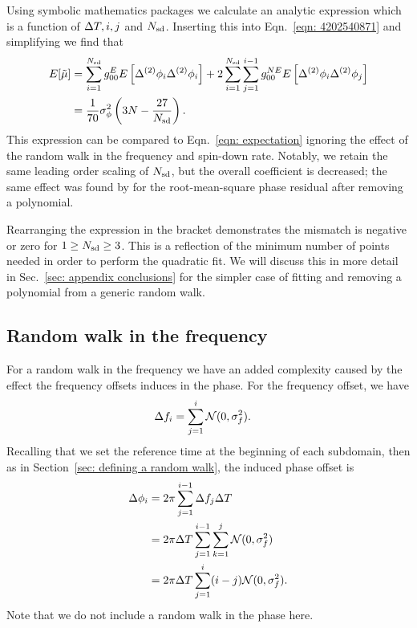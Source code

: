 \documentclass[../full_thesis/full_thesis.tex]{subfiles}
\begin{document}
Using symbolic mathematics packages we
calculate an analytic expression which is a function of $\Delta T, i, j$ and $N_{\textrm{sd}}$.
Inserting this into Eqn.~\eqref{eqn: 4202540871} and simplifying we find that
\begin{align}
E[\tilde{\mu}]  & = \sum_{i=1}^{N_{\textrm{sd}}}g_{00}^{E} E\left[\Delta^{(2)}\phi_{i}\Delta^{(2)}\phi_{i}\right]
+ 2 \sum_{i=1}^{N_{\textrm{sd}}}\sum_{j=1}^{i-1}g_{00}^{NE}E\left[\Delta^{(2)}\phi_{i}\Delta^{(2)}\phi_{j}\right]  \\
& = \frac{1}{70}\sigma_{\phi}^{2}\left(3N - \frac{27}{N_{\textrm{sd}}}\right).
\label{eqn: Expected mismatch RW in phase k2}
\end{align}
This expression can be compared to Eqn.~\eqref{eqn: expectation} ignoring the
effect of the random walk in the frequency and spin-down rate. Notably, we
retain the same leading order scaling of $N_{\textrm{sd}}$, but the overall coefficient is
decreased; the same effect was found by \citet{Cordes1980} for the
root-mean-square phase residual after removing a polynomial.

Rearranging the expression in the bracket demonstrates the mismatch is negative
or zero for $1 \ge N_{\textrm{sd}} \ge 3$. This is a reflection of the minimum number of
points needed in order to perform the quadratic fit. We will discuss this in more
detail in Sec.~\ref{sec: appendix conclusions} for the simpler case of fitting
and removing a polynomial from a generic random walk.

\subsection{Random walk in the frequency}

For a random walk in the frequency we have an added complexity caused by the
effect the frequency offsets induces in the phase. For the frequency offset, we
have
\begin{align}
\Delta f_{i} &= \sum_{j=1}^{i}\mathcal{N}(0, \sigma_{f}^{2}).
\end{align}
Recalling that we set the reference time at the beginning of each subdomain,
then as in Section~\ref{sec: defining a random walk}, the induced phase offset is
\begin{align}
\Delta\phi_{i} &=2\pi \sum_{j=1}^{i-1}\Delta f_{j}\Delta T \\
 & = 2\pi\Delta T \sum_{j=1}^{i-1}\sum_{k=1}^{j}\mathcal{N}(0, \sigma_{f}^{2}) \\
& = 2\pi\Delta T \sum_{j=1}^{i}(i-j)\mathcal{N}(0, \sigma_{f}^{2}).
\label{eqn: P2F}
\end{align}
Note that we do not include a random walk in the phase here.
\end{document}
